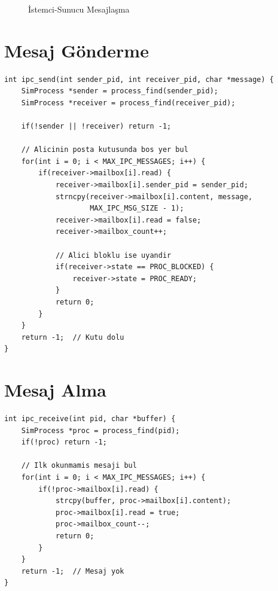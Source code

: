 \documentclass[12pt,a4paper]{report}
\begin{document}
\begin{figure}[h]
\centering
{}
\caption{İstemci-Sunucu Mesajlaşma}
\end{figure}

\section{Mesaj Gönderme}

\begin{lstlisting}[caption={ipc\_send Fonksiyonu}]
int ipc_send(int sender_pid, int receiver_pid, char *message) {
    SimProcess *sender = process_find(sender_pid);
    SimProcess *receiver = process_find(receiver_pid);
    
    if(!sender || !receiver) return -1;
    
    // Alicinin posta kutusunda bos yer bul
    for(int i = 0; i < MAX_IPC_MESSAGES; i++) {
        if(receiver->mailbox[i].read) {
            receiver->mailbox[i].sender_pid = sender_pid;
            strncpy(receiver->mailbox[i].content, message,
                    MAX_IPC_MSG_SIZE - 1);
            receiver->mailbox[i].read = false;
            receiver->mailbox_count++;
            
            // Alici bloklu ise uyandir
            if(receiver->state == PROC_BLOCKED) {
                receiver->state = PROC_READY;
            }
            return 0;
        }
    }
    return -1;  // Kutu dolu
}
\end{lstlisting}

\section{Mesaj Alma}

\begin{lstlisting}[caption={ipc\_receive Fonksiyonu}]
int ipc_receive(int pid, char *buffer) {
    SimProcess *proc = process_find(pid);
    if(!proc) return -1;
    
    // Ilk okunmamis mesaji bul
    for(int i = 0; i < MAX_IPC_MESSAGES; i++) {
        if(!proc->mailbox[i].read) {
            strcpy(buffer, proc->mailbox[i].content);
            proc->mailbox[i].read = true;
            proc->mailbox_count--;
            return 0;
        }
    }
    return -1;  // Mesaj yok
}
\end{lstlisting}
\end{document}
